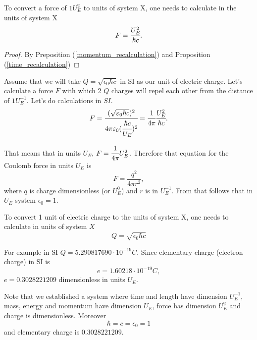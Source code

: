 \documentclass[main.tex]{subfiles}
\begin{document}
\begin{proposition}
To convert a force of $1U_E^2$ to units of system X, one needs to calculate in the units of system X
\begin{equation}
F=\cfrac{U_E^2}{\hbar c}.
\end{equation} 
\end{proposition}
\begin{proof}
By Preposition (\ref{momentum_recalculation}) and Proposition (\ref{time_recalculation})
\end{proof}

Assume that we will take $Q = \sqrt{\epsilon_0\hbar c}$ in SI as our unit of electric charge. Let's calculate a force $F$ with which 2 $Q$ charges will repel each other from the distance of $1U_E^{-1}$. Let's do calculations in $SI$.
\begin{equation}
F = \cfrac{(\sqrt{\epsilon_0\hbar c})^2}{4\pi \epsilon_0(\cfrac{\hbar c}{U_E})^2} = \cfrac{1}{4\pi} \cfrac{U_E^2}{\hbar c}.
\end{equation}

That means that in units $U_E$, $F = \cfrac{1}{4\pi} U_E^2$. Therefore that equation for the Coulomb force in units $U_E$ is
\begin{equation}
F = \frac{q^2}{4\pi r^2},
\end{equation} 
where $q$ is charge dimensionless (or $U_E^0$) and $r$ is in $U_E^{-1}$. From that follows that in $U_E$ system $\epsilon_0 = 1$. 

\begin{proposition}
To convert 1  unit of electric charge to the units of system X, one needs to calculate in units of system $X$
\begin{equation}
Q = \sqrt{\epsilon_0\hbar c}
\end{equation}
\end{proposition}
For example in SI $Q = 5.290817690\cdot 10^{-19} C$.
Since elementary charge (electron charge) in SI is
\begin{equation}
e = 1.60218\cdot10^{-19} C,
\end{equation}
$e = 0.3028221209$ dimensionless in units $U_E$.

Note that we established a system where time and length have dimension $U_E^{-1}$, mass, energy and momentum have dimension $U_E$, force has dimension $U_E^2$ and charge is dimensionless. Moreover
\begin{equation}
\boxed{\hbar = c = \epsilon_0 = 1}
\end{equation}
and elementary charge is $0.3028221209$.  
\end{document}
